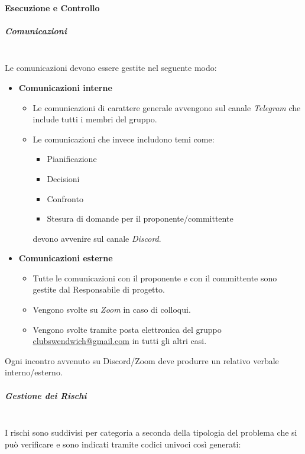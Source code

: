 \paragraph{Esecuzione e Controllo}

\subparagraph{Comunicazioni}
\mbox{}\\

Le comunicazioni devono essere gestite nel seguente modo:
\begin{itemize}
    \item \textbf{Comunicazioni interne}
    \begin{itemize}
        \item Le comunicazioni di carattere generale avvengono sul canale \textit{Telegram}
        che include tutti i membri del gruppo.
        \item Le comunicazioni che invece includono temi come: 
        \begin{itemize}
            \item Pianificazione
            \item Decisioni
            \item Confronto
            \item Stesura di domande per il proponente/committente
        \end{itemize}
        devono avvenire sul canale \textit{Discord}.
    \end{itemize}
    \item \textbf{Comunicazioni esterne}
    \begin{itemize}
        \item Tutte le comunicazioni con il proponente e con il committente sono gestite dal Responsabile di progetto.
        \item Vengono svolte su \textit{Zoom} in caso di colloqui.
        \item Vengono svolte tramite posta elettronica del gruppo \href{mailto:clubswendwich@gmail.com}{clubswendwich@gmail.com} in tutti gli altri casi.
    \end{itemize}
\end{itemize}

Ogni incontro avvenuto su Discord/Zoom deve produrre un relativo verbale interno/esterno.

\subparagraph{Gestione dei Rischi}
\mbox{}\\
I rischi sono suddivisi per categoria a seconda della tipologia del problema che si può verificare e
sono indicati tramite codici univoci così generati:


